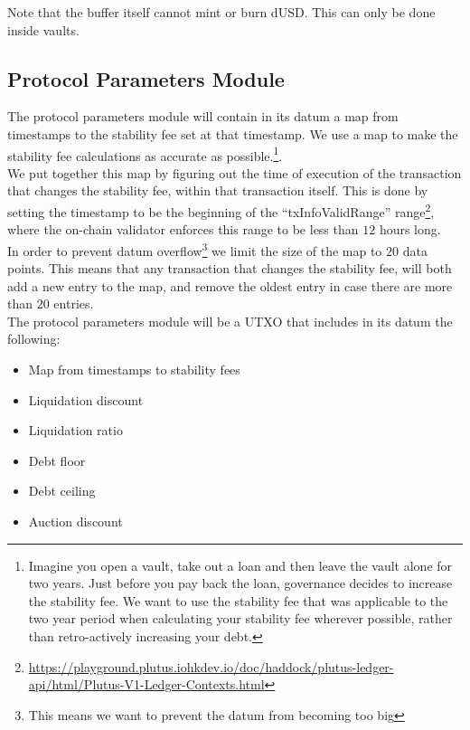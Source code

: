 \documentclass{article} %
\begin{document}
Note that the buffer itself cannot mint or burn dUSD. This can only be done
inside vaults.

\subsection{Protocol Parameters Module}

The protocol parameters module will contain in its datum a map from timestamps
to the stability fee set at that timestamp.
We use a map to make the stability fee calculations as accurate as
possible.\footnote{
  Imagine you open a vault, take out a loan and then leave the vault alone for
  two years.
  Just before you pay back the loan, governance decides to increase the
  stability fee.
  We want to use the stability fee that was applicable to the two year period
  when calculating your stability fee wherever possible, rather than
  retro-actively increasing your debt.
}. \\

We put together this map by figuring out the time of execution of the
transaction that changes the stability fee, within that transaction itself.
This is done by setting the timestamp to be the beginning of the
``txInfoValidRange'' range\footnote{
  \url{https://playground.plutus.iohkdev.io/doc/haddock/plutus-ledger-api/html/Plutus-V1-Ledger-Contexts.html}},
where the on-chain validator enforces this range to be less than $12$ hours
long. \\

In order to prevent datum overflow\footnote{
  This means we want to prevent the datum from becoming too big}
we limit the size of the map to $20$ data points.
This means that any transaction that changes the stability fee, will both add a
new entry to the map, and remove the oldest entry in case there are more than
$20$ entries. \\

The protocol parameters module will be a UTXO that includes in its datum the following:
\begin{itemize}
  \item Map from timestamps to stability fees
  \item Liquidation discount
  \item Liquidation ratio
  \item Debt floor
  \item Debt ceiling
  \item Auction discount
\end{itemize}
\end{document}
